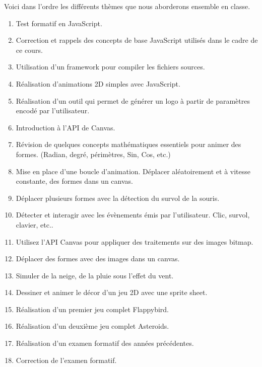 Voici dans l'ordre les différents thèmes que nous aborderons ensemble en classe.

\begin{enumerate}
    \item Test formatif en JavaScript.
    \item Correction et rappels des concepts de base JavaScript utilisés dans le cadre de ce cours.
    \item Utilisation d’un framework pour compiler les fichiers sources.
    \item Réalisation d'animations 2D simples avec JavaScript.
    \item Réalisation d’un outil qui permet de générer un logo à partir de paramètres encodé par l’utilisateur.
    \item Introduction à l’API de Canvas.
    \item Révision de quelques concepts mathématiques essentiels pour animer des formes. (Radian, degré, périmètres, Sin, Cos, etc.)
    \item Mise en place d’une boucle d’animation. Déplacer aléatoirement et à vitesse constante, des formes dans un canvas.
    \item Déplacer plusieurs formes avec la détection du survol de la souris.
    \item Détecter et interagir avec les évènements émis par l'utilisateur. Clic, survol, clavier, etc..
    \item Utilisez l’API Canvas pour appliquer des traitements sur des images bitmap.
    \item Déplacer des formes avec des images dans un canvas.
    \item Simuler de la neige, de la pluie sous l'effet du vent.
    \item Dessiner et animer le décor d’un jeu 2D avec une sprite sheet.
    \item Réalisation d’un premier jeu complet Flappybird.
    \item Réalisation d’un deuxième jeu complet Asteroids.
    \item Réalisation d’un examen formatif des années précédentes.
    \item Correction de l'examen formatif.
\end{enumerate}
